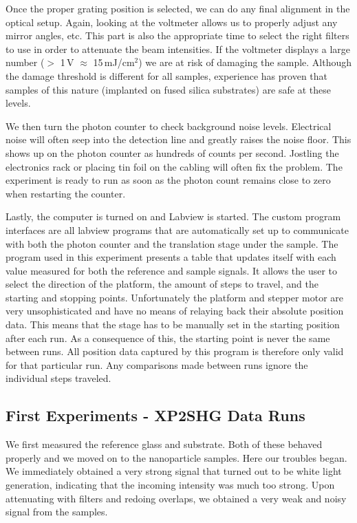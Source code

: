 Once the proper grating position is selected, we can do any final alignment in the optical setup. Again, looking at the voltmeter allows us to properly adjust any mirror angles, etc. This part is also the appropriate time to select the right filters to use in order to attenuate the beam intensities. If the voltmeter displays a large number ($>$ 1\,V $\approx$ 15\,mJ/cm$^{2}$) we are at risk of damaging the sample. Although the damage threshold is different for all samples, experience has proven that samples of this nature (implanted on fused silica substrates) are safe at these levels.

We then turn the photon counter to check background noise levels. Electrical noise will often seep into the detection line and greatly raises the noise floor. This shows up on the photon counter as hundreds of counts per second. Jostling the electronics rack or placing tin foil on the cabling will often fix the problem. The experiment is ready to run as soon as the photon count remains close to zero when restarting the counter.

Lastly, the computer is turned on and Labview is started. The custom program interfaces are all labview programs that are automatically set up to communicate with both the photon counter and the translation stage under the sample. The program used in this experiment presents a table that updates itself with each value measured for both the reference and sample signals. It allows the user to select the direction of the platform, the amount of steps to travel, and the starting and stopping points. Unfortunately the platform and stepper motor are very unsophisticated and have no means of relaying back their absolute position data. This means that the stage has to be manually set in the starting position after each run. As a consequence of this, the starting point is never the same between runs. All position data captured by this program is therefore only valid for that particular run. Any comparisons made between runs ignore the individual steps traveled.

\subsection{First Experiments - XP2SHG Data Runs}\label{chap_setup_proc_shg}
We first measured the reference glass and substrate. Both of these behaved properly and we moved on to the nanoparticle samples. Here our troubles began. We immediately obtained a very strong signal that turned out to be white light generation, indicating that the incoming intensity was much too strong. Upon attenuating with filters and redoing overlaps, we obtained a very weak and noisy signal from the samples.

